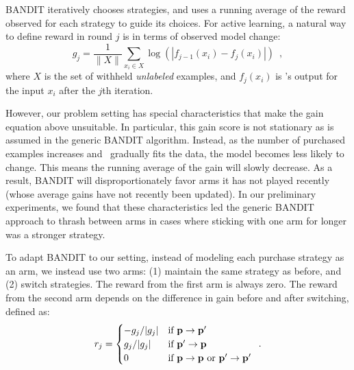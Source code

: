 \documentclass[10pt, conference, compsocconf]{IEEEtran}
\newcommand{\sys}{\Call{Hal}{}} %
\begin{document}
BANDIT iteratively chooses strategies, and uses a running average of the reward observed for each strategy to guide
its choices.  For active learning, a natural way to define reward in round $j$ is in terms of observed model change:
\begin{equation}
g_{j} = \frac{1}{\|X\|}\sum_{x_i \in X} \log{(|f_{j-1}(x_i) - f_{j}(x_i)|)}
\enspace ,
\end{equation}
where $X$ is the set of withheld {\em unlabeled} examples, and $f_{j}(x_i)$ is \sys's output for the 
input $x_i$ after the $j$th iteration.

However, our problem setting has special characteristics that make the gain equation above unsuitable.
In particular, this gain score is not stationary as is assumed in the generic BANDIT
algorithm. Instead,
as the number of purchased examples increases and \sys\ gradually fits the data, the model becomes less likely to change. 
This means the running average of the gain will slowly decrease.  As a result,
BANDIT will disproportionately favor arms it has not played recently (whose average gains have not recently been updated).
In our preliminary experiments, we found that these characteristics led the generic BANDIT approach to thrash 
between arms in cases where sticking with one arm for longer was a stronger strategy.

To adapt BANDIT to our setting, instead of modeling each purchase strategy as
an arm, we instead use
two arms: (1) maintain the same strategy as before, and (2) switch strategies.
The reward from the first arm is always zero.  The reward from the second arm
depends on the difference in gain before and after switching, defined as:
\vspace{-0.1in}
\begin{equation}
\label{eq:reward}
    r_{j}=
\begin{cases}
   -g_{j}/|g_{j}| & \text{if } {\bf p}\rightarrow{\bf p'}\\
    g_{j}/|g_{j}| & \text{if } {\bf p'}\rightarrow{\bf p}\\
    0 & \text{if } {\bf p}\rightarrow{\bf p} \text{ or } {\bf p'}\rightarrow{\bf p'}\\
\end{cases}
\enspace .
\end{equation}
\end{document}
